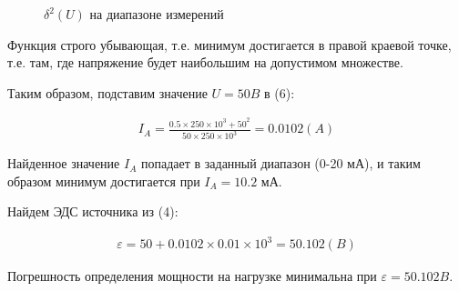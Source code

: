 \documentclass[a4paper,14pt]{extarticle}
\begin{document}
\begin{figure}[H]
  
  \caption{$ \delta^2(U) $ на диапазоне измерений }
\end{figure}

Функция строго убывающая, т.е. минимум достигается в правой краевой точке, т.е. там, где напряжение будет наибольшим на допустимом множестве.

Таким образом, подставим значение $U = 50 B$ в (6):

\begin{align}
  I_A = \frac{0.5 \times 250 \times 10^3 + 50^2}{50 \times 250 \times 10^3} = 0.0102 (A)
\end{align}

Найденное значение $I_A$ попадает в заданный диапазон (0-20 мА), и таким образом минимум достигается при $I_A = 10.2$ мА.

Найдем ЭДС источника из (4):

\begin{align}
  \varepsilon = 50 + 0.0102 \times 0.01 \times 10^3 = 50.102 (B)
\end{align}

Погрешность определения мощности на нагрузке минимальна при $ \varepsilon = 50.102 B $.
\end{document}
